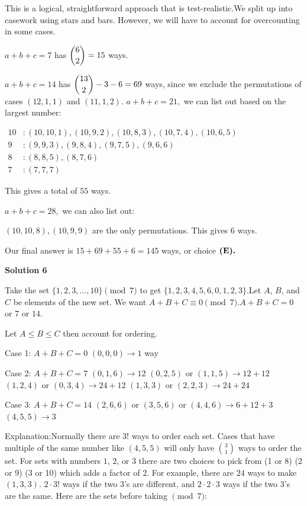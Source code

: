 \begin{enumerate}
This is a logical, straightforward approach that is test-realistic.We split up into casework using stars and bars. However, we will have to account for overcounting in some cases.

 $a+b+c=7$ has $\dbinom62=15$ ways.

 $a+b+c=14$ has $\dbinom{13}{2}-3-6=69$ ways, since we exclude the permutations of cases $(12,1,1)$ and $(11,1,2).$
$a+b+c=21,$ we can list out based on the largest number:

 $\begin{aligned} 10&: (10,10,1),(10,9,2),(10,8,3),(10,7,4),(10,6,5)\\ 9&: (9,9,3),(9,8,4),(9,7,5),(9,6,6)\\ 8&: (8,8,5),(8,7,6)\\ 7&: (7,7,7) \end{aligned}$

 This gives a total of $55$ ways.

 $a+b+c=28,$ we can also list out:

 $(10,10,8),(10,9,9)$ are the only permutations. This gives $6$ ways.

 Our final answer is $15+69+55+6=\boxed{145}$ ways, or choice $\textbf{\text{(E)}.}$




\textbf{Solution 6}

Take the set $\{1, 2, 3, ... , 10\} \pmod{7}$ to get $\{1, 2, 3, 4, 5, 6, 0, 1, 2, 3\}$.Let $A$, $B$, and $C$ be elements of the new set. We want $A+B+C \equiv 0 \pmod{7}$.$A+B+C = 0$ or $7$ or $14$.

 Let $A \leq B \leq C$ then account for ordering.

 Case 1: $A+B+C = 0$
$(0, 0, 0) \rightarrow 1$ way

 Case 2: $A+B+C = 7$
$(0, 1, 6) \rightarrow 12$
$(0, 2, 5)$ or $(1, 1, 5) \rightarrow 12 + 12$
$(1, 2, 4)$ or $(0, 3, 4) \rightarrow 24 + 12$
$(1, 3, 3)$ or $(2, 2, 3) \rightarrow 24 + 24$

 Case 3: $A+B+C = 14$
$(2, 6, 6)$ or $(3, 5, 6)$ or $(4, 4, 6) \rightarrow 6 + 12 + 3$
$(4, 5, 5) \rightarrow 3$

 Explanation:Normally there are $3!$ ways to order each set. Cases that have multiple of the same number like $(4, 5, 5)$ will only have $\binom{3}{1}$ ways to order the set. For sets with numbers $1$, $2$, or $3$ there are two choices to pick from (1 or 8) (2 or 9) (3 or 10) which adds a factor of $2$. For example, there are $24$ ways to make $(1, 3, 3)$. $2 \cdot 3!$ ways if the two 3’s are different, and $2 \cdot 2 \cdot 3$ ways if the two 3’s are the same. Here are the sets before taking $\pmod{7}$:


\end{enumerate}
